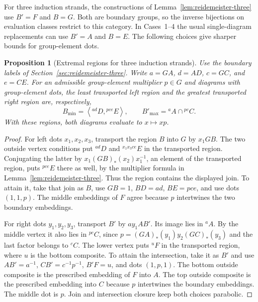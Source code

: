 \documentclass[11pt,a4paper]{article}
\numberwithin{equation}{section}
\newtheorem{proposition}[theorem]{Proposition}
\theoremstyle{definition}
\newcommand{\cg}[2]{{}^{#1}\!#2}
\begin{document}
For three induction strands, the constructions of
Lemma~\ref{lem:reidemeister-three} use \(B'=F\) and \(B=G\).
Both are boundary groups, so the inverse bijections on evaluation
classes restrict to this category. In Cases~1--4 the usual
single-diagram replacements can use \(B'=A\) and \(B=E\).
The following choices give sharper bounds for group-element dots.

\begin{proposition}[Extremal regions for three induction strands]\label{prop:parabolic-three-induction}
Use the boundary labels of Section~\ref{sec:reidemeister-three}.
Write \(a=\boxed{GA}\), \(d=\boxed{AD}\), \(c=\boxed{GC}\), and
\(e=\boxed{CE}\). For an admissible group-element multiplier
\(p\in G\) and diagrams with group-element dots, the least
transported left region and the greatest
transported right region are, respectively,
\[
 B_{\min}=\left\langle\cg{ad}{D},\cg{pce}{E}\right\rangle,
 \qquad
 B'_{\max}=\cg{a}{A}\cap\cg{pc}{C}.
\]
With these regions, both diagrams evaluate to \(x\mapsto xp\).
\end{proposition}

\begin{proof}
For left dots \(x_1,x_2,x_3\), transport the region \(B\) into \(G\)
by \(x_1\boxed{GB}\). The two outside vertex conditions put
\(\cg{ad}{D}\) and \(\cg{x_1x_3ce}{E}\) in the transported region.
Conjugating the latter by
\(x_1(\boxed{GB})_*(x_2)x_1^{-1}\), an element of the transported
region, puts \(\cg{pce}{E}\) there as well, by the multiplier
formula in Lemma~\ref{lem:reidemeister-three}. Thus the region
contains the displayed join. To attain it, take that join as
\(B\), use \(\boxed{GB}=1\), \(\boxed{BD}=ad\), \(\boxed{BE}=pce\),
and use dots \((1,1,p)\). The middle embeddings of \(F\) agree
because \(p\) intertwines the two boundary embeddings.

For right dots \(y_1,y_2,y_3\), transport \(B'\) by
\(a y_1\boxed{AB'}\). Its image lies in \(\cg{a}{A}\). By the
middle vertex it also lies in \(\cg{pc}{C}\), since
\(p=(\boxed{GA})_*(y_1)y_2(\boxed{GC})_*(y_3)\) and the last factor
belongs to \(\cg{c}{C}\). The lower vertex puts \(\cg{u}{F}\) in
the transported region, where \(u\) is the bottom composite.
To attain the intersection, take it as \(B'\) and use
\(\boxed{AB'}=a^{-1}\), \(\boxed{CB'}=c^{-1}p^{-1}\),
\(\boxed{B'F}=u\), and dots \((1,p,1)\). The bottom outside
composite is the prescribed embedding of \(F\) into \(A\).
The top outside composite is the prescribed embedding into \(C\)
because \(p\) intertwines the boundary embeddings. The middle
dot is \(p\). Join and intersection closure keep both choices
parabolic.
\end{proof}
\end{document}
